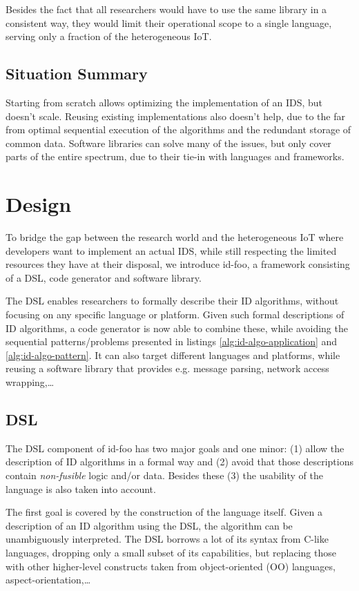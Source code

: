 \documentclass[conference]{IEEEtran}
\newcommand{\NAME}{id-foo\xspace}
\begin{document}
Besides the fact that all researchers would have to use the same library in a
consistent way, they would limit their operational scope to a single language,
serving only a fraction of the heterogeneous IoT.

\subsection{Situation Summary}

Starting from scratch allows optimizing the implementation of an IDS, but
doesn't scale. Reusing existing implementations also doesn't help, due to the
far from optimal sequential execution of the algorithms and the redundant
storage of common data. Software libraries can solve many of the issues, but
only cover parts of the entire spectrum, due to their tie-in with languages and
frameworks.

\section{Design}
\label{design}

To bridge the gap between the research world and the heterogeneous IoT where
developers want to implement an actual IDS, while still respecting the limited
resources they have at their disposal, we introduce \NAME, a framework
consisting of a DSL, code generator and software library.

The DSL enables researchers to formally describe their ID algorithms, without
focusing on any specific language or platform. Given such formal descriptions
of ID algorithms, a code generator is now able to combine these, while avoiding
the sequential patterns/problems presented in listings
\ref{alg:id-algo-application} and \ref{alg:id-algo-pattern}. It can also target
different languages and platforms, while reusing a software library that
provides e.g. message parsing, network access wrapping,\dots

\subsection{DSL}

The DSL component of \NAME has two major goals and one minor: (1) allow the
description of ID algorithms in a formal way and (2) avoid that those
descriptions contain \emph{non-fusible} logic and/or data. Besides these (3)
the usability of the language is also taken into account.

The first goal is covered by the construction of the language itself. Given a
description of an ID algorithm using the DSL, the algorithm can be
unambiguously interpreted. The DSL borrows a lot of its syntax from C-like
languages, dropping only a small subset of its capabilities, but replacing
those with other higher-level constructs taken from object-oriented (OO)
languages, aspect-orientation,\dots
\end{document}
